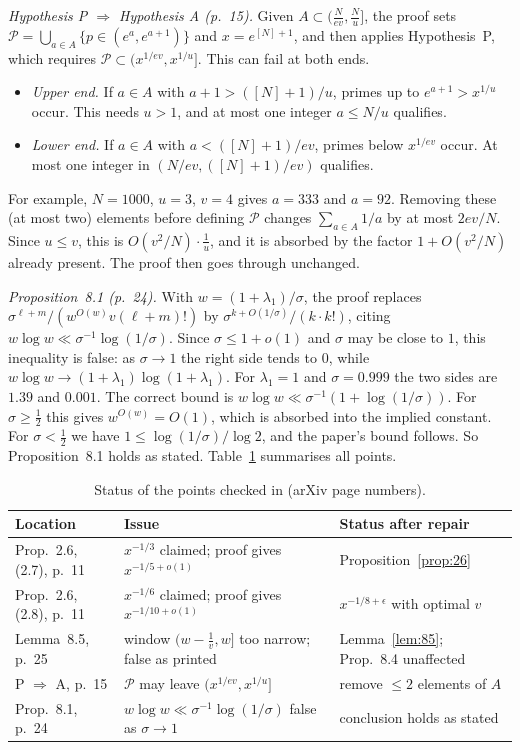 \documentclass[11pt,a4paper]{amsart}
\theoremstyle{remark}
\newcommand{\cP}{\mathcal P}
\begin{document}
\emph{Hypothesis P $\Rightarrow$ Hypothesis A (p.~15).} Given $A\subset(\frac N{ev},\frac Nu]$, the proof
sets $\cP=\bigcup_{a\in A}\{p\in(e^a,e^{a+1})\}$ and $x=e^{[N]+1}$, and then applies Hypothesis~P, which
requires $\cP\subset(x^{1/ev},x^{1/u}]$. This can fail at both ends.
\begin{itemize}
\item \emph{Upper end.} If $a\in A$ with $a+1>([N]+1)/u$, primes up to $e^{a+1}>x^{1/u}$ occur. This needs
$u>1$, and at most one integer $a\le N/u$ qualifies.
\item \emph{Lower end.} If $a\in A$ with $a<([N]+1)/ev$, primes below $x^{1/ev}$ occur. At most one integer
in $(N/ev,([N]+1)/ev)$ qualifies.
\end{itemize}
For example, $N=1000$, $u=3$, $v=4$ gives $a=333$ and $a=92$. Removing these (at most two) elements before
defining $\cP$ changes $\sum_{a\in A}1/a$ by at most $2ev/N$. Since $u\le v$, this is
$O(v^2/N)\cdot\frac1u$, and it is absorbed by the factor $1+O(v^2/N)$ already present. The proof then goes
through unchanged.

\emph{Proposition~8.1 (p.~24).} With $w=(1+\lambda_1)/\sigma$, the proof replaces
$\sigma^{\ell+m}/(w^{O(w)}v(\ell+m)!)$ by $\sigma^{k+O(1/\sigma)}/(k\cdot k!)$, citing
$w\log w\ll\sigma^{-1}\log(1/\sigma)$. Since $\sigma\le1+o(1)$ and $\sigma$ may be close to $1$, this
inequality is false: as $\sigma\to1$ the right side tends to $0$, while $w\log w\to(1+\lambda_1)\log(1+\lambda_1)$.
For $\lambda_1=1$ and $\sigma=0.999$ the two sides are $1.39$ and $0.001$. The correct bound is
$w\log w\ll\sigma^{-1}(1+\log(1/\sigma))$. For $\sigma\ge\frac12$ this gives $w^{O(w)}=O(1)$, which is
absorbed into the implied constant. For $\sigma<\frac12$ we have $1\le\log(1/\sigma)/\log2$, and the
paper's bound follows. So Proposition~8.1 holds as stated. Table~\ref{tab:sum} summarises all points.

\begin{table}[ht]
\centering\footnotesize
\caption{Status of the points checked in \cite{GKMat} (arXiv page numbers).}\label{tab:sum}
\begin{tabular}{lll}
\toprule
Location & Issue & Status after repair\\
\midrule
Prop.~2.6, (2.7), p.~11 & $x^{-1/3}$ claimed; proof gives $x^{-1/5+o(1)}$ & Proposition~\ref{prop:26}\\
Prop.~2.6, (2.8), p.~11 & $x^{-1/6}$ claimed; proof gives $x^{-1/10+o(1)}$ & $x^{-1/8+\epsilon}$ with optimal $v$\\
Lemma~8.5, p.~25 & window $(w-\frac1v,w]$ too narrow; false as printed & Lemma~\ref{lem:85}; Prop.~8.4 unaffected\\
P $\Rightarrow$ A, p.~15 & $\cP$ may leave $(x^{1/ev},x^{1/u}]$ & remove $\le2$ elements of $A$\\
Prop.~8.1, p.~24 & $w\log w\ll\sigma^{-1}\log(1/\sigma)$ false as $\sigma\to1$ & conclusion holds as stated\\
\bottomrule
\end{tabular}
\end{table}
\end{document}
